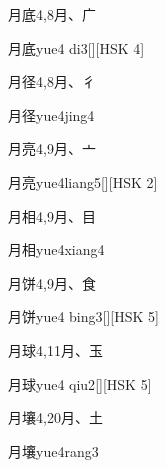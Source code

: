 \begin{entry}{月底}{4,8}{⽉、⼴}
  \begin{phonetics}{月底}{yue4 di3}[][HSK 4]
  \end{phonetics}
\end{entry}

\begin{entry}{月径}{4,8}{⽉、⼻}
  \begin{phonetics}{月径}{yue4jing4}
  \end{phonetics}
\end{entry}

\begin{entry}{月亮}{4,9}{⽉、⼇}
  \begin{phonetics}{月亮}{yue4liang5}[][HSK 2]
  \end{phonetics}
\end{entry}

\begin{entry}{月相}{4,9}{⽉、⽬}
  \begin{phonetics}{月相}{yue4xiang4}
  \end{phonetics}
\end{entry}

\begin{entry}{月饼}{4,9}{⽉、⾷}
  \begin{phonetics}{月饼}{yue4 bing3}[][HSK 5]
  \end{phonetics}
\end{entry}

\begin{entry}{月球}{4,11}{⽉、⽟}
  \begin{phonetics}{月球}{yue4 qiu2}[][HSK 5]
  \end{phonetics}
\end{entry}

\begin{entry}{月壤}{4,20}{⽉、⼟}
  \begin{phonetics}{月壤}{yue4rang3}
  \end{phonetics}
\end{entry}

